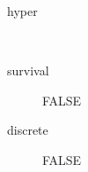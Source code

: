\begin{description}
	\item[hyper]\ 
	 \item[ survival ] FALSE 
	 \item[ discrete ] FALSE 
\end{description}
